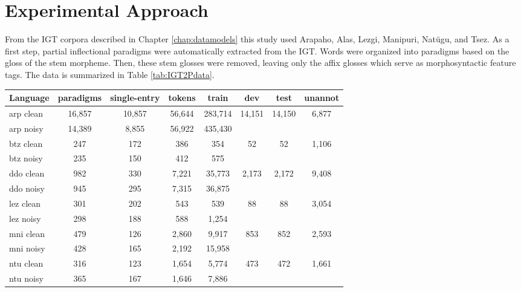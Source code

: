 \section{Experimental Approach}

From the IGT corpora described in Chapter \ref{chap:datamodels} this study used Arapaho, Alas, Lezgi, Manipuri, Nat\"ugu, and Tsez.
As a first step, partial inflectional paradigms were automatically extracted from the IGT. Words were organized into paradigms based on the gloss of the stem morpheme. Then, these stem glosses were removed, leaving only the affix glosses which serve as morphosyntactic feature tags. The data is summarized in Table \ref{tab:IGT2Pdata}.

\begin{table}[!tb]
    \centering
    \begin{tabular}{l|ccccccc}
       \textbf{Language} & \textbf{paradigms} & \textbf{single-entry} & \textbf{tokens} & \textbf{train} & \textbf{dev} & \textbf{test} & \textbf{unannot}  \\
       \hline
       arp clean & 16,857 & 10,857 & 56,644 & 283,714 & \multirow{2}{*}{14,151} & \multirow{2}{*}{14,150} & \multirow{2}{*}{6,877} \\
       arp noisy & 14,389 & 8,855 & 56,922 & 435,430 & & &  \\
       \hline
       btz clean & 247 & 172 & 386 & 354 & \multirow{2}{*}{52}  & \multirow{2}{*}{52} & \multirow{2}{*}{1,106} \\
       btz noisy & 235 & 150 & 412 & 575 & & & \\
       \hline
       ddo clean & 982 & 330 & 7,221 & 35,773 & \multirow{2}{*}{2,173} & \multirow{2}{*}{2,172} & \multirow{2}{*}{9,408} \\
       ddo noisy & 945 & 295 & 7,315 & 36,875 & & &  \\
       \hline
       lez clean & 301 & 202 & 543 & 539 & \multirow{2}{*}{88} & \multirow{2}{*}{88} & \multirow{2}{*}{3,054} \\
       lez noisy & 298 & 188 & 588 & 1,254 &  &  &  \\
       \hline
       mni clean & 479 & 126 & 2,860 & 9,917 & \multirow{2}{*}{853} & \multirow{2}{*}{852} & \multirow{2}{*}{2,593}\\
       mni noisy & 428 & 165 & 2,192 & 15,958 &  &  &  \\
       \hline
       ntu clean & 316 & 123 & 1,654 & 5,774 & \multirow{2}{*}{473} & \multirow{2}{*}{472} & \multirow{2}{*}{1,661} \\
       ntu noisy & 365 & 167 & 1,646 & 7,886 &  &  &  \\
     

\end{tabular}
\end{table}
